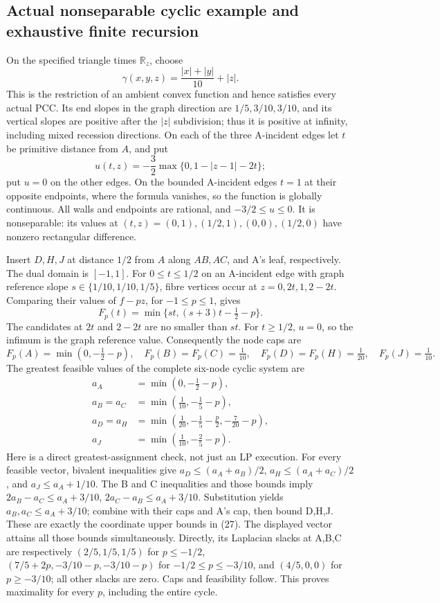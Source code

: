 \documentclass[
  11pt,
]{article}
\begin{document}
\subsection{Actual nonseparable cyclic example and exhaustive finite
recursion}\label{actual-nonseparable-cyclic-example-and-exhaustive-finite-recursion}

On the specified triangle times \(\mathbb R_z\), choose \[
 \gamma(x,y,z)=\frac{|x|+|y|}{10}+|z|.
\] This is the restriction of an ambient convex function and hence
satisfies every actual PCC. Its end slopes in the graph direction are
\(1/5,3/10,3/10\), and its vertical slopes are positive after the
\(|z|\) subdivision; thus it is positive at infinity, including mixed
recession directions. On each of the three A-incident edges let \(t\) be
primitive distance from \(A\), and put \[
 u(t,z)=-\frac32\max\{0,1-|z-1|-2t\};
\] put \(u=0\) on the other edges. On the bounded A-incident edges
\(t=1\) at their opposite endpoints, where the formula vanishes, so the
function is globally continuous. All walls and endpoints are rational,
and \(-3/2\leq u\leq0\). It is nonseparable: its values at
\((t,z)=(0,1),(1/2,1),(0,0),(1/2,0)\) have nonzero rectangular
difference.

Insert \(D,H,J\) at distance \(1/2\) from \(A\) along \(AB,AC\), and A's
leaf, respectively. The dual domain is \([-1,1]\). For
\(0\leq t\leq1/2\) on an A-incident edge with graph reference slope
\(s\in\{1/10,1/10,1/5\}\), fibre vertices occur at \(z=0,2t,1,2-2t\).
Comparing their values of \(f-pz\), for \(-1\leq p\leq1\), gives \[
 F_p(t)=\min\{st,(s+3)t-\tfrac12-p\}.
\] The candidates at \(2t\) and \(2-2t\) are no smaller than \(st\). For
\(t\geq1/2\), \(u=0\), so the infimum is the graph reference value.
Consequently the node caps are \[
 F_p(A)=\min(0,-\tfrac12-p),\quad F_p(B)=F_p(C)=\tfrac1{10},\quad
 F_p(D)=F_p(H)=\tfrac1{20},\quad F_p(J)=\tfrac1{10}.
\] The greatest feasible values of the complete six-node cyclic system
are \[
\begin{split}
 a_A&=\min(0,-\tfrac12-p),\\
 a_B=a_C&=\min(\tfrac1{10},-\tfrac15-p),\\
 a_D=a_H&=\min(\tfrac1{20},-\tfrac15-\tfrac p2,-\tfrac7{20}-p),\\
 a_J&=\min(\tfrac1{10},-\tfrac25-p).
\end{split}                                                       \tag{27}
\] Here is a direct greatest-assignment check, not just an LP execution.
For every feasible vector, bivalent inequalities give
\(a_D\leq(a_A+a_B)/2\), \(a_H\leq(a_A+a_C)/2\), and
\(a_J\leq a_A+1/10\). The B and C inequalities and those bounds imply
\(2a_B-a_C\leq a_A+3/10\), \(2a_C-a_B\leq a_A+3/10\). Substitution
yields \(a_B,a_C\leq a_A+3/10\); combine with their caps and A's cap,
then bound D,H,J. These are exactly the coordinate upper bounds in (27).
The displayed vector attains all those bounds simultaneously. Directly,
its Laplacian slacks at A,B,C are respectively \((2/5,1/5,1/5)\) for
\(p\leq-1/2\), \((7/5+2p,-3/10-p,-3/10-p)\) for \(-1/2\leq p\leq-3/10\),
and \((4/5,0,0)\) for \(p\geq-3/10\); all other slacks are zero. Caps
and feasibility follow. This proves maximality for every \(p\),
including the entire cycle.
\end{document}
